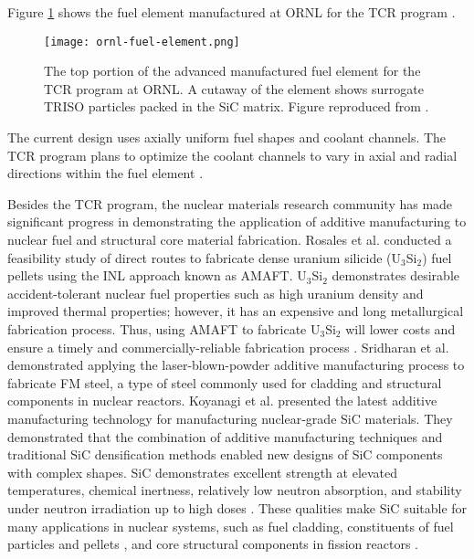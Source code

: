 Figure \ref{fig:ornl-fuel-element} shows the fuel element manufactured at 
\gls{ORNL} for the \gls{TCR} program \cite{betzler_transformational_2020}. 
\begin{figure}[htb!]
    \centering
    \texttt{[image: ornl-fuel-element.png]} 
    \caption{The top portion of the advanced manufactured fuel element 
    for the \acrfull{TCR} program at \acrfull{ORNL}.
    A cutaway of the element shows surrogate TRISO particles packed in the SiC matrix.
    Figure reproduced from \cite{betzler_transformational_2020}.}
    \label{fig:ornl-fuel-element}
\end{figure}
The current design uses axially uniform fuel shapes and coolant channels. 
The \gls{TCR} program plans to optimize the coolant channels to vary in axial 
and radial directions within the fuel element 
\cite{betzler_transformational_2020,sobes_artificial_2020}. 

Besides the \gls{TCR} program, the nuclear materials research community has made 
significant progress in demonstrating the application of additive manufacturing 
to nuclear fuel and structural core material fabrication. 
Rosales et al. \cite{rosales_characterizing_2019} conducted a feasibility study 
of direct routes to fabricate dense uranium silicide (U$_3$Si$_2$) fuel pellets 
using the \gls{INL} approach known as \gls{AMAFT}. 
U$_3$Si$_2$ demonstrates desirable accident-tolerant nuclear fuel properties 
such as high uranium density and improved thermal properties; however, it has 
an expensive and long metallurgical fabrication process. 
Thus, using \gls{AMAFT} to fabricate U$_3$Si$_2$ will lower costs and ensure a
timely and commercially-reliable fabrication process \cite{rosales_characterizing_2019}. 
Sridharan et al. \cite{sridharan_performance_2019} demonstrated applying
the laser-blown-powder additive manufacturing process to fabricate \gls{FM} steel, 
a type of steel commonly used for cladding and structural components in nuclear 
reactors. 
Koyanagi et al. \cite{koyanagi_additive_2020} presented the latest 
additive manufacturing technology for manufacturing nuclear-grade \gls{SiC} materials. 
They demonstrated that the combination of additive manufacturing techniques and 
traditional \gls{SiC} densification methods enabled new designs of \gls{SiC} 
components with complex shapes. 
\gls{SiC} demonstrates excellent strength at elevated temperatures, chemical inertness, 
relatively low neutron absorption, and stability under neutron irradiation up 
to high doses \cite{sauder_ceramic_2014, snead_handbook_2007,koyanagi_additive_2020}. 
These qualities make \gls{SiC} suitable for many applications in nuclear systems, 
such as fuel cladding, constituents of fuel particles \cite{snead_handbook_2007} 
and pellets \cite{terrani_progress_2015}, and core structural components in fission 
reactors \cite{sauder_ceramic_2014}. 

